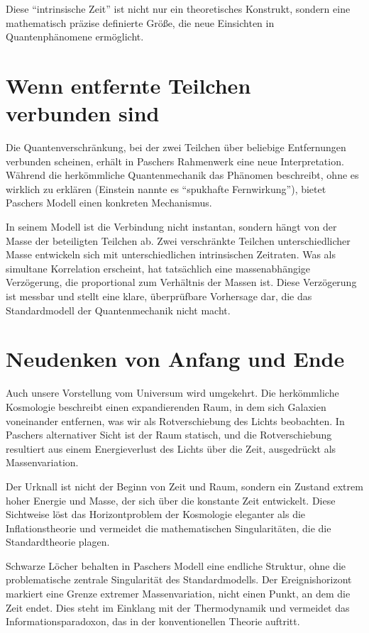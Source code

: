 \documentclass[a4paper,12pt]{article}
\begin{document}
	Diese ``intrinsische Zeit'' ist nicht nur ein theoretisches Konstrukt, sondern eine mathematisch präzise definierte Größe, die neue Einsichten in Quantenphänomene ermöglicht.
	
	\section{Wenn entfernte Teilchen verbunden sind}
	
	Die Quantenverschränkung, bei der zwei Teilchen über beliebige Entfernungen verbunden scheinen, erhält in Paschers Rahmenwerk eine neue Interpretation. Während die herkömmliche Quantenmechanik das Phänomen beschreibt, ohne es wirklich zu erklären (Einstein nannte es ``spukhafte Fernwirkung''), bietet Paschers Modell einen konkreten Mechanismus.
	
	In seinem Modell ist die Verbindung nicht instantan, sondern hängt von der Masse der beteiligten Teilchen ab. Zwei verschränkte Teilchen unterschiedlicher Masse entwickeln sich mit unterschiedlichen intrinsischen Zeitraten. Was als simultane Korrelation erscheint, hat tatsächlich eine massenabhängige Verzögerung, die proportional zum Verhältnis der Massen ist. Diese Verzögerung ist messbar und stellt eine klare, überprüfbare Vorhersage dar, die das Standardmodell der Quantenmechanik nicht macht.
	
	\section{Neudenken von Anfang und Ende}
	
	Auch unsere Vorstellung vom Universum wird umgekehrt. Die herkömmliche Kosmologie beschreibt einen expandierenden Raum, in dem sich Galaxien voneinander entfernen, was wir als Rotverschiebung des Lichts beobachten. In Paschers alternativer Sicht ist der Raum statisch, und die Rotverschiebung resultiert aus einem Energieverlust des Lichts über die Zeit, ausgedrückt als Massenvariation.
	
	Der Urknall ist nicht der Beginn von Zeit und Raum, sondern ein Zustand extrem hoher Energie und Masse, der sich über die konstante Zeit entwickelt. Diese Sichtweise löst das Horizontproblem der Kosmologie eleganter als die Inflationstheorie und vermeidet die mathematischen Singularitäten, die die Standardtheorie plagen.
	
	Schwarze Löcher behalten in Paschers Modell eine endliche Struktur, ohne die problematische zentrale Singularität des Standardmodells. Der Ereignishorizont markiert eine Grenze extremer Massenvariation, nicht einen Punkt, an dem die Zeit endet. Dies steht im Einklang mit der Thermodynamik und vermeidet das Informationsparadoxon, das in der konventionellen Theorie auftritt.
	
\end{document}

